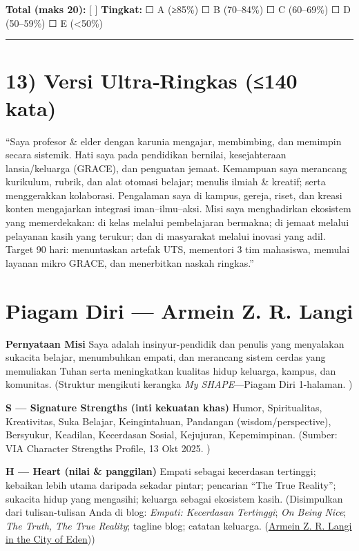 \documentclass[
  letterpaper,
  DIV=11,
  numbers=noendperiod]{scrreprt}
\begin{document}
\textbf{Total (maks 20):} {[} {]} \textbf{Tingkat:} ☐ A (≥85\%) ☐ B
(70--84\%) ☐ C (60--69\%) ☐ D (50--59\%) ☐ E (\textless50\%)

\begin{center}\rule{0.5\linewidth}{0.5pt}\end{center}

\section{13) Versi Ultra‑Ringkas (≤140
kata)}\label{versi-ultraringkas-140-kata}

``Saya profesor \& elder dengan karunia mengajar, membimbing, dan
memimpin secara sistemik. Hati saya pada pendidikan bernilai,
kesejahteraan lansia/keluarga (GRACE), dan penguatan jemaat. Kemampuan
saya merancang kurikulum, rubrik, dan alat otomasi belajar; menulis
ilmiah \& kreatif; serta menggerakkan kolaborasi. Pengalaman saya di
kampus, gereja, riset, dan kreasi konten mengajarkan integrasi
iman--ilmu--aksi. Misi saya menghadirkan ekosistem yang memerdekakan: di
kelas melalui pembelajaran bermakna; di jemaat melalui pelayanan kasih
yang terukur; dan di masyarakat melalui inovasi yang adil. Target 90
hari: menuntaskan artefak UTS, mementori 3 tim mahasiswa, memulai
layanan mikro GRACE, dan menerbitkan naskah ringkas.''

\section{Piagam Diri --- Armein Z. R.
Langi}\label{piagam-diri-armein-z.-r.-langi}

\textbf{Pernyataan Misi} Saya adalah insinyur-pendidik dan penulis yang
menyalakan sukacita belajar, menumbuhkan empati, dan merancang sistem
cerdas yang memuliakan Tuhan serta meningkatkan kualitas hidup keluarga,
kampus, dan komunitas. (Struktur mengikuti kerangka \emph{My
SHAPE}---Piagam Diri 1-halaman. )

\textbf{S --- Signature Strengths (inti kekuatan khas)} Humor,
Spiritualitas, Kreativitas, Suka Belajar, Keingintahuan, Pandangan
(wisdom/perspective), Bersyukur, Keadilan, Kecerdasan Sosial, Kejujuran,
Kepemimpinan. (Sumber: VIA Character Strengths Profile, 13 Okt 2025. )

\textbf{H --- Heart (nilai \& panggilan)} Empati sebagai kecerdasan
tertinggi; kebaikan lebih utama daripada sekadar pintar; pencarian ``The
True Reality''; sukacita hidup yang mengasihi; keluarga sebagai
ekosistem kasih. (Disimpulkan dari tulisan-tulisan Anda di blog:
\emph{Empati: Kecerdasan Tertinggi}; \emph{On Being Nice}; \emph{The
Truth, The True Reality}; tagline blog; catatan keluarga.
(\href{https://azrl.wordpress.com/2010/04/06/empati-kecerdasan-tertinggi/?utm_source=chatgpt.com}{Armein
Z. R. Langi in the City of Eden}))
\end{document}
